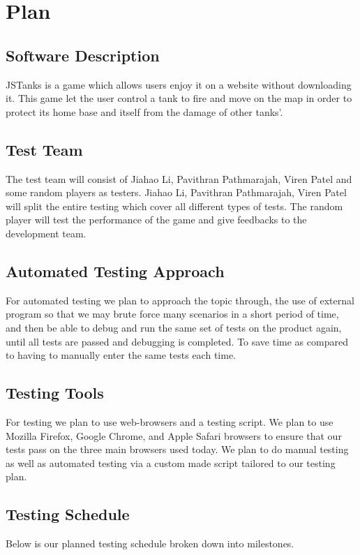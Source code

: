 \documentclass{article}
\begin{document}
\section{Plan}
\subsection{Software Description}
JSTanks is a game which allows users enjoy it on a website without downloading 
it. This game let the user control a tank to fire and move on the map in order 
to protect its home base and itself from the damage of other tanks'.
\subsection{Test Team}
The test team will consist of Jiahao Li, Pavithran Pathmarajah, Viren Patel 
and some random players as testers. Jiahao Li, Pavithran Pathmarajah, Viren 
Patel will split the entire testing which cover all different types of tests. 
The random player will test the performance of the game and give feedbacks to 
the development team.

\subsection{Automated Testing Approach}
For automated testing we plan to approach the topic through, the use of 
external program so that we may brute force many scenarios in a short period 
of time, and then be able to debug and run the same set of tests on the 
product again, until all tests are passed and debugging is completed. To save 
time as compared to having to manually enter the same tests each time.

\subsection{Testing Tools}
For testing we plan to use web-browsers and a testing script. We plan to use
Mozilla Firefox, Google Chrome, and Apple Safari browsers to ensure that our
tests pass on the three main browsers used today. We plan to do manual testing
as well as automated testing via a custom made script tailored to our testing
plan.

\subsection{Testing Schedule}
Below is our planned testing schedule broken down into milestones.
\end{document}
